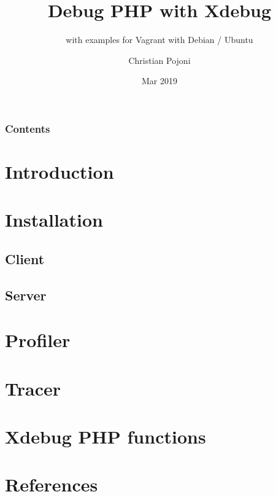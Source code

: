 \documentclass{beamer}
\title{Debug PHP with Xdebug}
\subtitle{with examples for Vagrant with Debian / Ubuntu}
\author{Christian Pojoni}
\institute{\url{www.secret-source.eu}}
\date{Mar 2019}
\begin{document}
\frame{\titlepage}
\begin{frame}\frametitle{Contents}
    \tableofcontents
\end{frame}

\section{Introduction}


\section{Installation} 
\subsection{Client}


\subsection{Server}


\section{Profiler}


\section{Tracer}


\section{Xdebug PHP functions}


\section{References}

\end{document}
